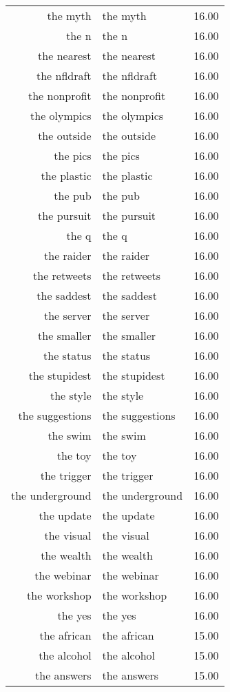 \begin{table}[ht]
\begin{tabular}{rlr}
  the myth & the myth & 16.00 \\ 
  the n & the n & 16.00 \\ 
  the nearest & the nearest & 16.00 \\ 
  the nfldraft & the nfldraft & 16.00 \\ 
  the nonprofit & the nonprofit & 16.00 \\ 
  the olympics & the olympics & 16.00 \\ 
  the outside & the outside & 16.00 \\ 
  the pics & the pics & 16.00 \\ 
  the plastic & the plastic & 16.00 \\ 
  the pub & the pub & 16.00 \\ 
  the pursuit & the pursuit & 16.00 \\ 
  the q & the q & 16.00 \\ 
  the raider & the raider & 16.00 \\ 
  the retweets & the retweets & 16.00 \\ 
  the saddest & the saddest & 16.00 \\ 
  the server & the server & 16.00 \\ 
  the smaller & the smaller & 16.00 \\ 
  the status & the status & 16.00 \\ 
  the stupidest & the stupidest & 16.00 \\ 
  the style & the style & 16.00 \\ 
  the suggestions & the suggestions & 16.00 \\ 
  the swim & the swim & 16.00 \\ 
  the toy & the toy & 16.00 \\ 
  the trigger & the trigger & 16.00 \\ 
  the underground & the underground & 16.00 \\ 
  the update & the update & 16.00 \\ 
  the visual & the visual & 16.00 \\ 
  the wealth & the wealth & 16.00 \\ 
  the webinar & the webinar & 16.00 \\ 
  the workshop & the workshop & 16.00 \\ 
  the yes & the yes & 16.00 \\ 
  the african & the african & 15.00 \\ 
  the alcohol & the alcohol & 15.00 \\ 
  the answers & the answers & 15.00 \\ 

\end{tabular}
\end{table}
